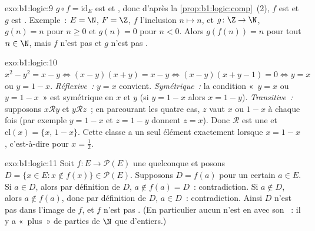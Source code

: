 \begin{solution}{exo:b1:logic:9}
$g \circ f = \mathrm{id}_E$ est  et , donc d'après
la \cref{prop:b1:logic:comp}~(2), $f$ est  et $g$ est .
Exemple~: $E = \N$, $F = \Z$, $f$ l'inclusion $n \mapsto n$, et
$g \colon \Z \to \N$, $g(n) = n$ pour $n \geq 0$ et $g(n) = 0$ pour
$n < 0$. Alors $g(f(n)) = n$ pour tout $n \in \N$, mais $f$ n'est pas
 et $g$ n'est pas .
\end{solution}

\begin{solution}{exo:b1:logic:10}
$x^2 - y^2 = x - y \iff (x - y)(x + y) = x - y \iff (x - y)(x + y - 1)
= 0 \iff y = x$ ou $y = 1 - x$. \emph{Réflexive~:} $y = x$ convient.
\emph{Symétrique~:} la condition «~$y = x$ ou $y = 1 - x$~» est
symétrique en $x$ et $y$ (si $y = 1 - x$ alors $x = 1 - y$).
\emph{Transitive~:} supposons $x \mathbin{\mathcal{R}} y$ et $y
\mathbin{\mathcal{R}} z$~; en parcourant les quatre cas, $z$ vaut $x$
ou $1 - x$ à chaque fois (par exemple $y = 1 - x$ et $z = 1 - y$
donnent $z = x$). Donc $\mathcal{R}$ est une  et
$\mathrm{cl}(x) = \{x,\, 1 - x\}$. Cette classe a un seul élément
exactement lorsque $x = 1 - x$, c'est-à-dire pour $x = \frac12$.
\end{solution}

\begin{solution}{exo:b1:logic:11}
Soit $f \colon E \to \mathcal{P}(E)$ une  quelconque et
posons $D = \{x \in E : x \notin f(x)\} \in \mathcal{P}(E)$. Supposons
$D = f(a)$ pour un certain $a \in E$. Si $a \in D$, alors par définition
de $D$, $a \notin f(a) = D$~: contradiction. Si $a \notin D$, alors
$a \notin f(a)$, donc par définition de $D$, $a \in D$~: contradiction.
Ainsi $D$ n'est pas dans l'image de $f$, et $f$ n'est pas .
(En particulier aucun  n'est en  avec son ~: il y a «~plus~» de parties de $\N$ que d'entiers.)
\end{solution}

